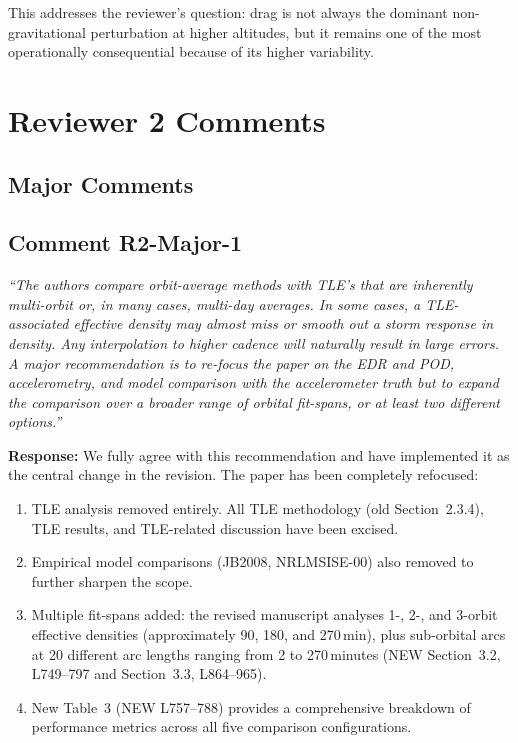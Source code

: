 \documentclass[11pt]{article}
\newcommand{\reviewercomment}[1]{%
  \medskip
  \noindent\textit{\color{reviewblue}#1}%
  \medskip
}
\begin{document}
This addresses the reviewer's question: drag is not always the dominant non-gravitational perturbation at higher altitudes, but it remains one of the most operationally consequential because of its higher variability.


\section{Reviewer 2 Comments}

\subsection*{Major Comments}

\subsection{Comment R2-Major-1}

\reviewercomment{%
``The authors compare orbit-average methods with TLE's that are inherently multi-orbit or, in many cases, multi-day averages. In some cases, a TLE-associated effective density may almost miss or smooth out a storm response in density. Any interpolation to higher cadence will naturally result in large errors. A major recommendation is to re-focus the paper on the EDR and POD, accelerometry, and model comparison with the accelerometer truth but to expand the comparison over a broader range of orbital fit-spans, or at least two different options.''}

\textbf{Response:}
We fully agree with this recommendation and have implemented it as the central change in the revision. The paper has been completely refocused:

\begin{enumerate}[nosep]
  \item TLE analysis removed entirely. All TLE methodology (old Section~2.3.4), TLE results, and TLE-related discussion have been excised.
  \item Empirical model comparisons (JB2008, NRLMSISE-00) also removed to further sharpen the scope.
  \item Multiple fit-spans added: the revised manuscript analyses 1-, 2-, and 3-orbit effective densities (approximately 90, 180, and 270\,min), plus sub-orbital arcs at 20 different arc lengths ranging from 2 to 270\,minutes (NEW Section~3.2, L749--797 and Section~3.3, L864--965).
  \item New Table~3 (NEW L757--788) provides a comprehensive breakdown of performance metrics across all five comparison configurations.
\end{enumerate}
\end{document}

